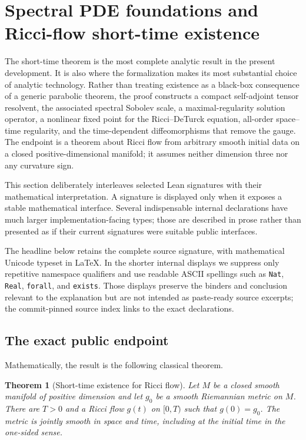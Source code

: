 \documentclass[11pt]{article}
\theoremstyle{plain}
\newtheorem{theorem}{Theorem}[section]
\theoremstyle{definition}
\theoremstyle{remark}
\begin{document}
\section{Spectral PDE foundations and Ricci-flow short-time existence}
\label{sec:short-time-existence}
\label{subsec:ShortTimeExistence}%

The short-time theorem is the most complete analytic result in the present
development.  It is also where the formalization makes its most substantial
choice of analytic technology.  Rather than treating existence as a black-box
consequence of a generic parabolic theorem, the proof constructs a compact
self-adjoint tensor resolvent, the associated spectral Sobolev scale, a
maximal-regularity solution operator, a nonlinear fixed point for the
Ricci--DeTurck equation, all-order space--time regularity, and the
time-dependent diffeomorphisms that remove the gauge.  The endpoint is a
theorem about Ricci flow from arbitrary smooth initial data on a closed
positive-dimensional manifold; it assumes neither dimension three nor any
curvature sign.

This section deliberately interleaves selected Lean signatures with their
mathematical interpretation.  A signature is displayed only when it exposes a
stable mathematical interface.  Several indispensable internal declarations
have much larger implementation-facing types; those are described in prose
rather than presented as if their current signatures were suitable public
interfaces.

The headline below retains the complete source signature, with mathematical
Unicode typeset in LaTeX.  In the shorter internal displays we suppress only
repetitive namespace qualifiers and use readable ASCII spellings such as
\texttt{Nat}, \texttt{Real}, \texttt{forall}, and \texttt{exists}.  Those
displays preserve the binders and conclusion relevant to the explanation but
are not intended as paste-ready source excerpts; the commit-pinned source index
links to the exact declarations.

\subsection{The exact public endpoint}
\label{subsec:short-time-public-endpoint}

Mathematically, the result is the following classical theorem.

\begin{theorem}[Short-time existence for Ricci flow]
\label{thm:rf-short-time-existence}
Let $M$ be a closed smooth manifold of positive dimension and let $g_0$ be a
smooth Riemannian metric on $M$.  There are $T>0$ and a Ricci flow $g(t)$ on
$[0,T)$ such that $g(0)=g_0$.  The metric is jointly smooth in space and time,
including at the initial time in the one-sided sense.
\end{theorem}
\end{document}
